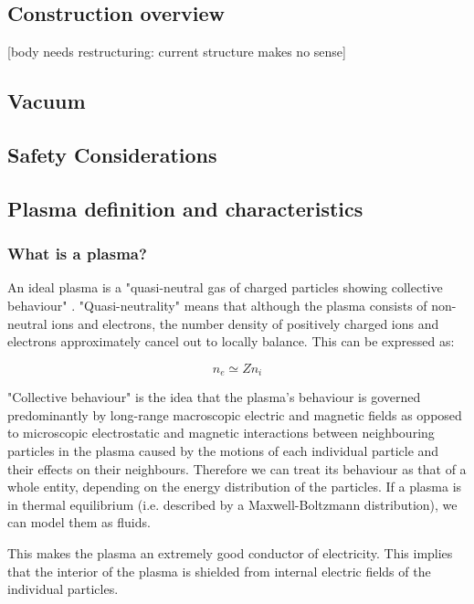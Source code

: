 \documentclass[a4paper,titlepage]{article}
\let\cite\parencite
\begin{document}
\begin{flushleft}
\section{Construction overview} [body needs restructuring: current structure makes no sense]
\subsection{Vacuum}
\subsection{Safety Considerations}

\subsection{Plasma definition and characteristics}
\label{plasma_def_char}

\subsubsection{What is a plasma?}
\label{wtf_is_a_plasma_eagle_noise}
An ideal plasma is a "quasi-neutral gas of charged particles showing collective behaviour" \cite{gibbon_2014_introduction}. "Quasi-neutrality" means that although the plasma consists of non-neutral ions and electrons, the number density of positively charged ions and electrons approximately cancel out to locally balance. This can be expressed as: 

\begin{equation}
n_e \simeq Zn_i 
\end{equation}

"Collective behaviour" is the idea that the plasma's behaviour is governed predominantly by long-range macroscopic electric and magnetic fields as opposed to microscopic electrostatic and magnetic interactions between neighbouring particles in the plasma caused by the motions of each individual particle and their effects on their neighbours. Therefore we can treat its behaviour as that of a whole entity, depending on the energy distribution of the particles. If a plasma is in thermal equilibrium (i.e. described by a Maxwell-Boltzmann distribution), we can model them as fluids. 

This makes the plasma an extremely good conductor of electricity. This implies that the interior of the plasma is shielded from internal electric fields of the individual particles. \cite{freidberg_2008_plasma} \newline


\end{flushleft}
\end{document}
